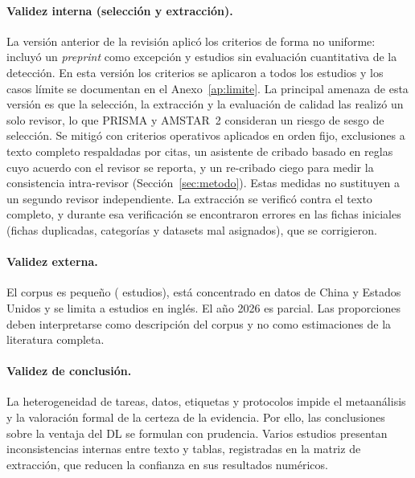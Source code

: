 \documentclass[12pt, a4paper]{article}
\begin{document}
\paragraph{Validez interna (selecci\'{o}n y extracci\'{o}n).} La versi\'{o}n anterior de la revisi\'{o}n aplic\'{o} los criterios de forma no uniforme: incluy\'{o} un \textit{preprint} como excepci\'{o}n y estudios sin evaluaci\'{o}n cuantitativa de la detecci\'{o}n. En esta versi\'{o}n los criterios se aplicaron a todos los estudios y los casos l\'{i}mite se documentan en el Anexo~\ref{ap:limite}. La principal amenaza de esta versi\'{o}n es que la selecci\'{o}n, la extracci\'{o}n y la evaluaci\'{o}n de calidad las realiz\'{o} un solo revisor, lo que PRISMA y AMSTAR~2 consideran un riesgo de sesgo de selecci\'{o}n. Se mitig\'{o} con criterios operativos aplicados en orden fijo, exclusiones a texto completo respaldadas por citas, un asistente de cribado basado en reglas cuyo acuerdo con el revisor se reporta, y un re-cribado ciego para medir la consistencia intra-revisor (Secci\'{o}n~\ref{sec:metodo}). Estas medidas no sustituyen a un segundo revisor independiente. La extracci\'{o}n se verific\'{o} contra el texto completo, y durante esa verificaci\'{o}n se encontraron errores en las fichas iniciales (fichas duplicadas, categor\'{i}as y datasets mal asignados), que se corrigieron.

\paragraph{Validez externa.} El corpus es peque\~{n}o (\Nestudios{} estudios), est\'{a} concentrado en datos de China y Estados Unidos y se limita a estudios en ingl\'{e}s. El a\~{n}o 2026 es parcial. Las proporciones deben interpretarse como descripci\'{o}n del corpus y no como estimaciones de la literatura completa.

\paragraph{Validez de conclusi\'{o}n.} La heterogeneidad de tareas, datos, etiquetas y protocolos impide el metaan\'{a}lisis y la valoraci\'{o}n formal de la certeza de la evidencia. Por ello, las conclusiones sobre la ventaja del DL se formulan con prudencia. Varios estudios presentan inconsistencias internas entre texto y tablas, registradas en la matriz de extracci\'{o}n, que reducen la confianza en sus resultados num\'{e}ricos.

\end{document}
